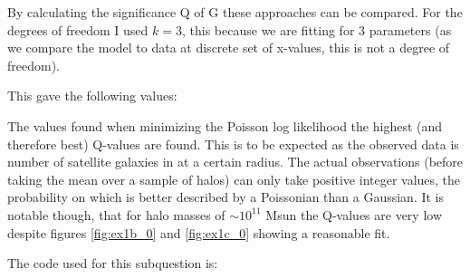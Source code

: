 By calculating the significance Q of G these approaches can be compared.
For the degrees of freedom I used $k=3$, this because we are fitting for 3 parameters (as we compare the model to data at discrete set of x-values, this is not a degree of freedom).

This gave the following values:


The values found when minimizing the Poisson log likelihood the highest (and therefore best) Q-values are found.
This is to be expected as the observed data is number of satellite galaxies in at a certain radius.
The actual observations (before taking the mean over a sample of halos) can only take positive integer values, the probability on which is better described by a Poissonian than a Gaussian.
It is notable though, that for halo masses of $\sim 10^{11}$ Msun the Q-values are very low despite figures \ref{fig:ex1b_0} and \ref{fig:ex1c_0} showing a reasonable fit.

The code used for this subquestion is:

